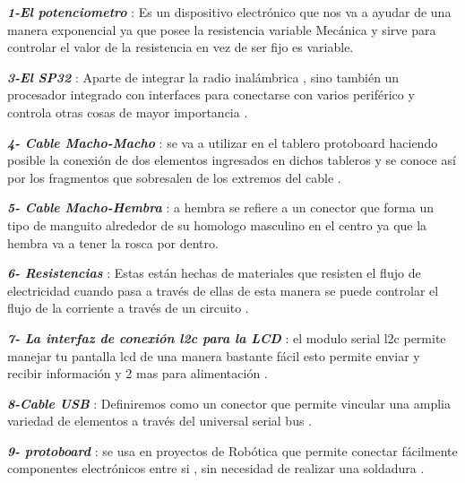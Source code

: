     \textbf{\textit{1-El potenciometro }}: Es un dispositivo electrónico que nos va a ayudar de una manera exponencial ya que posee la resistencia
    variable Mecánica y sirve para controlar  el valor de la resistencia en vez de ser fijo es variable. 
    \newline
    
    \textbf{\textit{3-El SP32 }}: Aparte de integrar la radio  inalámbrica , sino también un procesador integrado con interfaces para conectarse con varios periférico  y controla otras cosas de mayor importancia .  
    \newline
    
    \textbf{\textit{4- Cable Macho-Macho  }}: se va a utilizar en el tablero protoboard haciendo posible la conexión de dos elementos ingresados en dichos tableros y se conoce así por los fragmentos que sobresalen de los extremos del cable .   
    \newline
    
    \textbf{\textit{5- Cable Macho-Hembra }}: a hembra se refiere a un conector que forma un tipo de manguito alrededor de su homologo masculino en el centro  ya que la hembra va a tener la rosca por dentro.
    \newline
    
    \textbf{\textit{6- Resistencias  }}: Estas están hechas de materiales que resisten el flujo de electricidad cuando pasa a través de ellas de esta manera se puede controlar el flujo de la corriente a través de un circuito .   \newline 
    
    \textbf{\textit{7- La interfaz de conexión l2c para la LCD  }}:  el modulo serial l2c permite manejar tu pantalla lcd de una manera bastante fácil esto permite enviar y recibir información y 2 mas para alimentación . \newline 
    
    \textbf{\textit{8-Cable USB }}: Definiremos como un conector que permite vincular una amplia variedad de elementos a través del universal serial bus . 
    \newline 
    
    \textbf{\textit{9- protoboard }}: se usa en proyectos de Robótica que permite conectar fácilmente componentes electrónicos entre si , sin necesidad de realizar una soldadura . 
    \newline 
    
